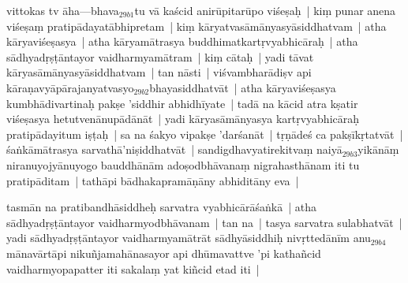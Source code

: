 \documentclass[article,12pt,a4paper]{memoir}%
\newcounter{parCount}
\begin{document}
	  
	  \pstart \leavevmode%
	\label{thakur75-52.8}\label{sarit__ratnakīrtinibandhāvali__141640}vittokas tv āha—bhava{\tiny $_{29b1}$}tu vā kaścid anirūpitarūpo viśeṣaḥ | kiṃ punar anena viśeṣaṃ pratipādayatābhipretam | kiṃ kāryatvasāmānyasyāsiddhatvam | atha kāryaviśeṣasya | atha kāryamātrasya buddhimatkartṛvyabhicāraḥ | atha sādhyadṛṣṭāntayor vaidharmyamātram | kiṃ cātaḥ | yadi tāvat kāryasāmānyasyāsiddhatvam | tan nāsti | viśvambharādiṣv api kāraṇavyāpārajanyatvasyo{\tiny $_{29b2}$}bhayasiddhatvāt | atha kāryaviśeṣasya kumbhādivartinaḥ pakṣe 'siddhir abhidhīyate | tadā na kācid atra kṣatir viśeṣasya hetutvenānupādānāt | yadi kāryasāmānyasya kartṛvyabhicāraḥ pratipādayitum iṣṭaḥ | sa na śakyo vipakṣe 'darśanāt | tṛṇādeś ca pakṣīkṛtatvāt | śaṅkāmātrasya \label{ratnakīrtinibandhāvali__36r1PF7IMUZ7KUXZS9SZJ6Y0O7I}sarvathā'ni\label{ratnakīrtinibandhāvali__36r1PF7IMUYASOPXV8CSA661H3U}ṣiddhatvāt | sandigdhavyatirekitvaṃ naiyā{\tiny $_{29b3}$}yikānāṃ niranuyojyānuyogo bauddhānām adoṣodbhāvanaṃ nigrahasthānam iti tu pratipāditam | tathāpi bādhakapramāṇāny abhiditāny eva |
	{}
	\pend%
      

	  
	  \pstart \leavevmode%
	tasmān na pratibandhāsiddheḥ sarvatra vyabhicārāśaṅkā | atha sādhyadṛṣṭāntayor vaidharmyodbhāvanam | tan na | tasya sarvatra sulabhatvāt | yadi sādhyadṛṣṭāntayor vaidharmyamātrāt sādhyāsiddhiḥ nivṛttedānīm anu{\tiny $_{29b4}$}mānavārtāpi nikuñjamahānasayor api dhūmavattve 'pi kathañcid vaidharmyopapatter iti sakalaṃ yat kiñcid etad\label{sarit__ratnakīrtinibandhāvali__143038} iti |
	{}
	\pend%
      
\end{document}
